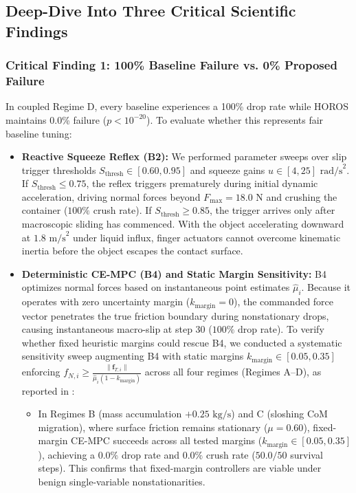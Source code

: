 \subsection{Deep-Dive Into Three Critical Scientific Findings}

\subsubsection{Critical Finding 1: 100\% Baseline Failure vs. 0\% Proposed Failure}
In coupled Regime D, every baseline experiences a 100\% drop rate while HOROS maintains 0.0\% failure ($p < 10^{-20}$). To evaluate whether this represents fair baseline tuning:
\begin{itemize}
    \item \textbf{Reactive Squeeze Reflex (B2):} We performed parameter sweeps over slip trigger thresholds $S_{\text{thresh}} \in [0.60, 0.95]$ and squeeze gains $u \in [4, 25]\text{ rad/s}^2$. If $S_{\text{thresh}} \le 0.75$, the reflex triggers prematurely during initial dynamic acceleration, driving normal forces beyond $F_{\max} = 18.0\text{ N}$ and crushing the container ($100\%$ crush rate). If $S_{\text{thresh}} \ge 0.85$, the trigger arrives only after macroscopic sliding has commenced. With the object accelerating downward at $1.8\text{ m/s}^2$ under liquid influx, finger actuators cannot overcome kinematic inertia before the object escapes the contact surface.
    \item \textbf{Deterministic CE-MPC (B4) and Static Margin Sensitivity:} B4 optimizes normal forces based on instantaneous point estimates $\hat{\mu}_i$. Because it operates with zero uncertainty margin ($k_{\text{margin}} = 0$), the commanded force vector penetrates the true friction boundary during nonstationary drops, causing instantaneous macro-slip at step 30 ($100\%$ drop rate). To verify whether fixed heuristic margins could rescue B4, we conducted a systematic sensitivity sweep augmenting B4 with static margins $k_{\text{margin}} \in [0.05, 0.35]$ enforcing $f_{N, i} \ge \frac{\|\mathbf{f}_{T, i}\|}{\hat{\mu}_i (1 - k_{\text{margin}})}$ across all four regimes (Regimes A--D), as reported in :
    \begin{itemize}
        \item In Regimes B (mass accumulation $+0.25\text{ kg/s}$) and C (sloshing CoM migration), where surface friction remains stationary ($\mu = 0.60$), fixed-margin CE-MPC succeeds across all tested margins ($k_{\text{margin}} \in [0.05, 0.35]$), achieving a $0.0\%$ drop rate and $0.0\%$ crush rate ($50.0 / 50$ survival steps). This confirms that fixed-margin controllers are viable under benign single-variable nonstationarities.

\end{itemize}
\end{itemize}
